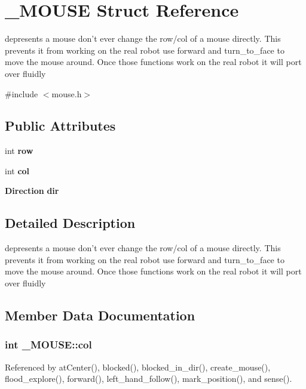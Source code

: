 \section{\-\_\-\-M\-O\-U\-S\-E Struct Reference}
\label{struct__MOUSE}


depresents a mouse don't ever change the row/col of a mouse directly. This prevents it from working on the real robot use forward and turn\-\_\-to\-\_\-face to move the mouse around. Once those functions work on the real robot it will port over fluidly  




{\ttfamily \#include $<$mouse.\-h$>$}

\subsection*{Public Attributes}
\begin{DoxyCompactItemize}
\item 
int {\bf row}
\item 
int {\bf col}
\item 
{\bf Direction} {\bf dir}
\end{DoxyCompactItemize}


\subsection{Detailed Description}
depresents a mouse don't ever change the row/col of a mouse directly. This prevents it from working on the real robot use forward and turn\-\_\-to\-\_\-face to move the mouse around. Once those functions work on the real robot it will port over fluidly 

\subsection{Member Data Documentation}
\subsubsection[{col}]{\setlength{\rightskip}{0pt plus 5cm}int \-\_\-\-M\-O\-U\-S\-E\-::col}\label{struct__MOUSE_af473aaf6728c4d711e558d81af672725}


Referenced by at\-Center(), blocked(), blocked\-\_\-in\-\_\-dir(), create\-\_\-mouse(), flood\-\_\-explore(), forward(), left\-\_\-hand\-\_\-follow(), mark\-\_\-position(), and sense().

